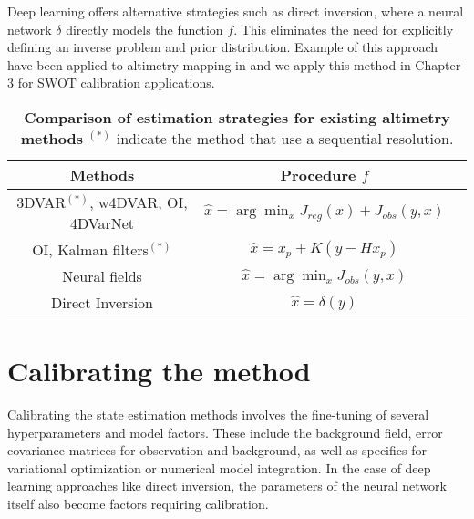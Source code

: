 \begin{bibunit}
Deep learning offers alternative strategies such as direct inversion, where a neural network $\delta$ directly models the function $f$. This eliminates the need for explicitly defining an inverse problem and prior distribution. Example of this approach have been applied to altimetry mapping in \cite{} and we apply this method in Chapter 3 for SWOT calibration applications.




\begin{table}
  \centering
  \begin{tabular}{|c|c|c|}
\hline
    Methods & Procedure $f$ \\
\hline


    3DVAR$^{(*)}$, w4DVAR, OI, 4DVarNet & $\hat{x} = \arg\min_x J_{reg}(x) +  J_{obs}(y, x)$ \\

    OI, Kalman filters$^{(*)}$ & $\hat{x} = x_p + K(y - Hx_p)$ \\
    Neural fields & $\hat{x} = \arg\min_x J_{obs}(y, x)$ \\
    
    Direct Inversion & $\hat{x} = \delta(y)$ \\
\hline
\end{tabular}
\caption{\textbf{Comparison of estimation strategies for existing altimetry methods} $^(*)$ indicate the method that use a sequential resolution.}
\end{table}

%




\section{Calibrating the method}
Calibrating the state estimation methods involves the fine-tuning of several hyperparameters and model factors. These include the background field, error covariance matrices for observation and background, as well as specifics for variational optimization or numerical model integration. In the case of deep learning approaches like direct inversion, the parameters of the neural network itself also become factors requiring calibration.



\end{bibunit}

